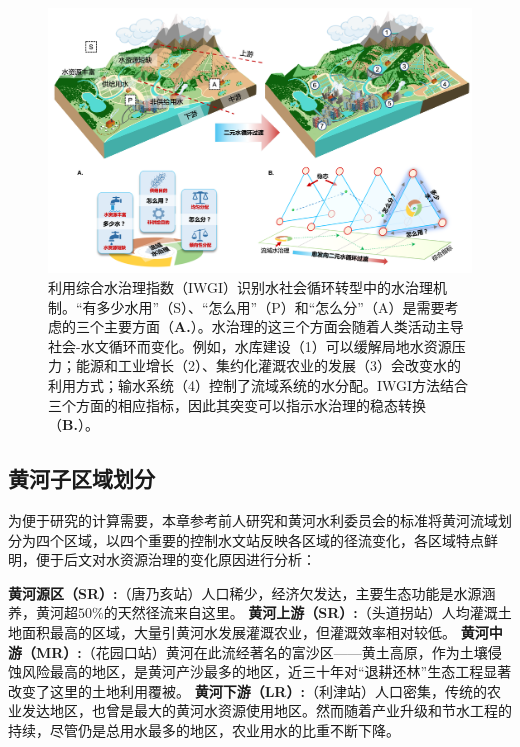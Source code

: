 \begin{figure}[!ht]
\centering
\includegraphics[width=\textwidth]{img/ch4/ch4_framework.png}
\caption[利用综合水治理指数（IWGI）识别水社会循环转型中的水治理机制]{
    利用综合水治理指数（IWGI）识别水社会循环转型中的水治理机制。“有多少水用”（S）、“怎么用”（P）和“怎么分”（A）是需要考虑的三个主要方面（\textbf{A.}）。水治理的这三个方面会随着人类活动主导社会-水文循环而变化。例如，水库建设（1）可以缓解局地水资源压力；能源和工业增长（2）、集约化灌溉农业的发展（3）会改变水的利用方式；输水系统（4）控制了流域系统的水分配。IWGI方法结合三个方面的相应指标，因此其突变可以指示水治理的稳态转换（\textbf{B.}）。}\label{ch4:fig:framework}
\end{figure}

\subsection{黄河子区域划分}\label{ch4:sec:region}

为便于研究的计算需要，本章参考前人研究和黄河水利委员会的标准将黄河流域划分为四个区域\cite{shuilibuhuangheshuiliweiyuanhui,wang2019c,wang2016e}，以四个重要的控制水文站反映各区域的径流变化，各区域特点鲜明，便于后文对水资源治理的变化原因进行分析：

\textbf{黄河源区（SR）:}（唐乃亥站）人口稀少，经济欠发达，主要生态功能是水源涵养，黄河超$50\%$的天然径流来自这里。
\textbf{黄河上游（SR）:}（头道拐站）人均灌溉土地面积最高的区域，大量引黄河水发展灌溉农业，但灌溉效率相对较低。
\textbf{黄河中游（MR）:}（花园口站）黄河在此流经著名的富沙区——黄土高原，作为土壤侵蚀风险最高的地区，是黄河产沙最多的地区，近三十年对“退耕还林”生态工程显著改变了这里的土地利用覆被。
\textbf{黄河下游（LR）:}（利津站）人口密集，传统的农业发达地区，也曾是最大的黄河水资源使用地区。然而随着产业升级和节水工程的持续，尽管仍是总用水最多的地区，农业用水的比重不断下降。


